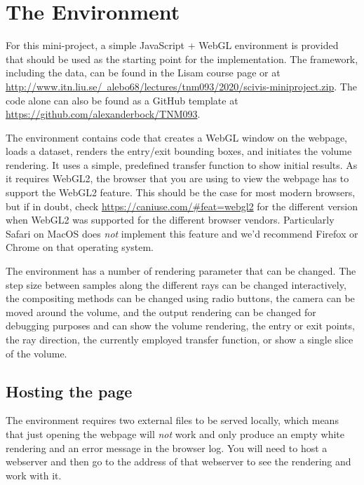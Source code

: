 \documentclass{labinstructions}
\begin{document}
\section{The Environment}
For this mini-project, a simple JavaScript + WebGL environment is provided that should be used as the starting point for the implementation.  The framework, including the data, can be found in the Lisam course page or at \href{http://www.itn.liu.se/~alebo68/lectures/tnm093/2020/scivis-miniproject.zip}{http://www.itn.liu.se/~alebo68/lectures/tnm093/2020/scivis-miniproject.zip}.  The code alone can also be found as a GitHub template at \href{https://github.com/alexanderbock/TNM093}{https://github.com/alexanderbock/TNM093}.

The environment contains code that creates a WebGL window on the webpage, loads a dataset, renders the entry/exit bounding boxes, and initiates the volume rendering.  It uses a simple, predefined transfer function to show initial results.  As it requires WebGL2, the browser that you are using to view the webpage has to support the WebGL2 feature.  This should be the case for most modern browsers, but if in doubt, check \href{https://caniuse.com/\#feat=webgl2}{https://caniuse.com/\#feat=webgl2} for the different version when WebGL2 was supported for the different browser vendors.  Particularly Safari on MacOS does \emph{not} implement this feature and we'd recommend Firefox or Chrome on that operating system.

The environment has a number of rendering parameter that can be changed.  The step size between samples along the different rays can be changed interactively, the compositing methods can be changed using radio buttons, the camera can be moved around the volume, and the output rendering can be changed for debugging purposes and can show the volume rendering, the entry or exit points, the ray direction, the currently employed transfer function, or show a single slice of the volume.

\subsection{Hosting the page}
The environment requires two external files to be served locally, which means that just opening the webpage will \emph{not} work and only produce an empty white rendering and an error message in the browser log.  You will need to host a webserver and then go to the address of that webserver to see the rendering and work with it.
\end{document}

